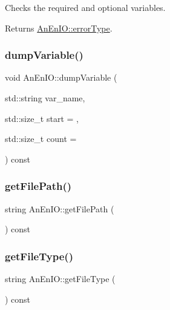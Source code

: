 Checks the required and optional variables. \begin{DoxyReturn}{Returns}
\mbox{\hyperlink{class_an_en_i_o_aa56bc1ec6610b86db4349bce20f9ead0}{An\+En\+I\+O\+::error\+Type}}. 
\end{DoxyReturn}
\mbox{\label{class_an_en_i_o_acd5682e81361d75ff5566ae1df5fa023}} 
\subsubsection{\texorpdfstring{dump\+Variable()}{dumpVariable()}}
{\footnotesize\ttfamily void An\+En\+I\+O\+::dump\+Variable (\begin{DoxyParamCaption}\item[{std\+::string}]{var\+\_\+name,  }\item[{std\+::size\+\_\+t}]{start = {},  }\item[{std\+::size\+\_\+t}]{count = {} }\end{DoxyParamCaption}) const}

\mbox{\label{class_an_en_i_o_aae00624f6127c7946496443f5322ec8e}} 
\subsubsection{\texorpdfstring{get\+File\+Path()}{getFilePath()}}
{\footnotesize\ttfamily string An\+En\+I\+O\+::get\+File\+Path (\begin{DoxyParamCaption}{ }\end{DoxyParamCaption}) const}

\mbox{\label{class_an_en_i_o_a6f51b190d64895a4ad907abcf4a10b75}} 
\subsubsection{\texorpdfstring{get\+File\+Type()}{getFileType()}}
{\footnotesize\ttfamily string An\+En\+I\+O\+::get\+File\+Type (\begin{DoxyParamCaption}{ }\end{DoxyParamCaption}) const}

